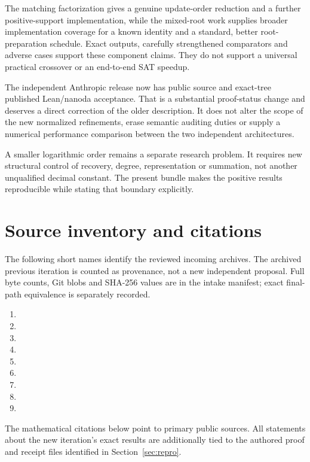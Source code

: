 \documentclass[11pt,letterpaper]{article}
\theoremstyle{remark}\newtheorem{remark}[theorem]{Remark}
\begin{document}
The matching factorization gives a genuine update-order reduction and a further positive-support implementation, while the mixed-root work supplies broader implementation coverage for a known identity and a standard, better root-preparation schedule. Exact outputs, carefully strengthened comparators and adverse cases support these component claims. They do not support a universal practical crossover or an end-to-end SAT speedup.

The independent Anthropic release now has public source and exact-tree published Lean/nanoda acceptance. That is a substantial proof-status change and deserves a direct correction of the older description. It does not alter the scope of the new normalized refinements, erase semantic auditing duties or supply a numerical performance comparison between the two independent architectures.

A smaller logarithmic order remains a separate research problem. It requires new structural control of recovery, degree, representation or summation, not another unqualified decimal constant. The present bundle makes the positive results reproducible while stating that boundary explicitly.

\appendix
\section{Source inventory and citations}
\label{sec:sources}
The following short names identify the reviewed incoming archives. The archived previous iteration is counted as provenance, not a new independent proposal. Full byte counts, Git blobs and SHA-256 values are in the intake manifest; exact final-path equivalence is separately recorded.
\begin{enumerate}[nosep]
\item {}
\item {}
\item {}
\item {}
\item {}
\item {}
\item {}
\item {}
\item {}
\end{enumerate}
The mathematical citations below point to primary public sources. All statements about the new iteration's exact results are additionally tied to the authored proof and receipt files identified in Section~\ref{sec:repro}.
\end{document}
